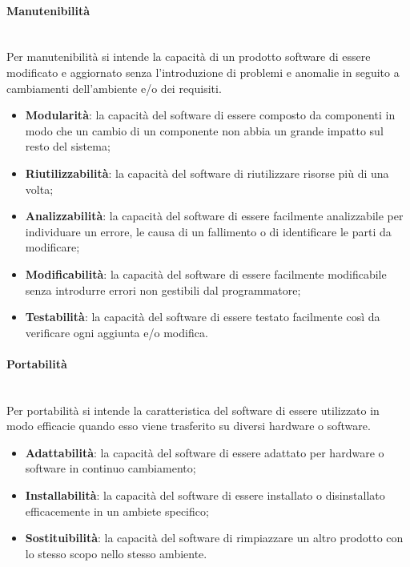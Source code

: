 	\paragraph{Manutenibilità} \mbox{}\\
	Per manutenibilità si intende la capacità di un prodotto software di essere modificato e aggiornato senza l'introduzione di problemi e anomalie in seguito a cambiamenti dell'ambiente e/o dei requisiti.
	\begin{itemize}
		\item \textbf{Modularità}: la capacità del software di essere composto da componenti in modo che un cambio di un componente non abbia un grande impatto sul resto del sistema;
		\item \textbf{Riutilizzabilità}: la capacità del software di riutilizzare risorse più di una volta;
		\item \textbf{Analizzabilità}: la capacità del software di essere facilmente analizzabile per individuare un errore, le causa di un fallimento o di identificare le parti da modificare;
		\item \textbf{Modificabilità}: la capacità del software di essere facilmente modificabile senza introdurre errori non gestibili dal programmatore;
		\item \textbf{Testabilità}: la capacità del software di essere testato facilmente così da verificare ogni aggiunta e/o modifica.
	\end{itemize}
	\paragraph{Portabilità} \mbox{}\\ 
	Per portabilità si intende la caratteristica del software di essere utilizzato in modo efficacie quando esso viene trasferito su diversi hardware o software.
	\begin{itemize}
		\item \textbf{Adattabilità}: la capacità del software di essere adattato per hardware o software in continuo cambiamento;
		\item \textbf{Installabilità}: la capacità del software di essere installato o disinstallato efficacemente in un ambiete specifico;
		\item \textbf{Sostituibilità}: la capacità del software di rimpiazzare un altro prodotto con lo stesso scopo nello stesso ambiente.
	\end{itemize}